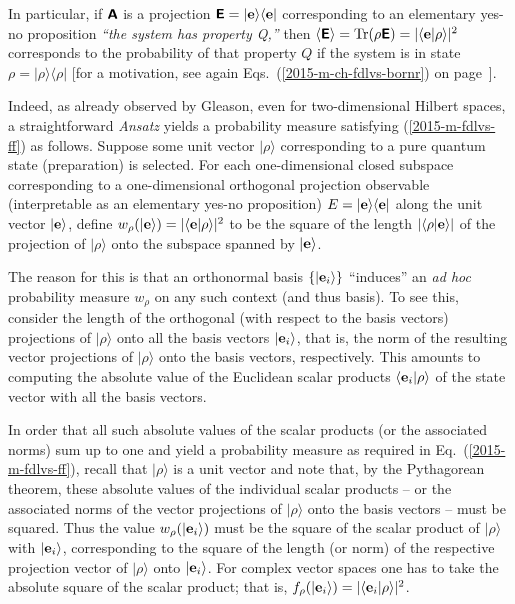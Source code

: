 In particular, if $\textsf{\textbf{A}}$ is a projection $\textsf{\textbf{E}}= \vert {\bf e} \rangle \langle {\bf e} \vert$
corresponding to an elementary yes-no proposition
{\it ``the system has property Q,''} then $\langle \textsf{\textbf{E}}\rangle = \textrm{Tr}({  \rho}  \textsf{\textbf{E}})
=
\vert \langle {\bf e}\vert \rho \rangle \vert^2$ corresponds
to the probability of that property $Q$ if the system is in state $\rho= \vert \rho \rangle \langle \rho \vert$
[for a motivation, see again Eqs.~(\ref{2015-m-ch-fdlvs-bornr}) on page~\pageref{2015-m-ch-fdlvs-bornr}].


Indeed, as already observed by Gleason, even for two-dimensional Hilbert spaces, a straightforward {\it Ansatz}
yields a  probability measure satisfying (\ref{2015-m-fdlvs-ff}) as follows.
Suppose some unit vector $\vert \rho \rangle$ corresponding to a pure quantum state (preparation) is selected.
For each one-dimensional closed subspace corresponding
to a one-dimensional orthogonal projection observable (interpretable as an elementary yes-no proposition)
$E=\vert {\bf e}\rangle \langle {\bf e} \vert$
along the unit vector $\vert {\bf e}\rangle$,
define
$w_\rho(\vert {\bf e}\rangle ) =  \vert \langle {\bf e} \vert  \rho \rangle \vert^2$
to be the  square of the length $\vert \langle \rho \vert {\bf e} \rangle \vert$ of the
projection of $\vert \rho \rangle$ onto the subspace spanned by $\vert {\bf e}\rangle$.



The reason for this is that an orthonormal
basis $\{  \vert  {\bf e}_i \rangle   \}$ ``induces''
an {\it ad hoc}  probability measure $w_\rho $
on any such context (and thus basis).
To see this,
consider the length  of
the orthogonal (with respect to the basis vectors)
projections of $\vert  \rho \rangle$
onto all the basis vectors $\vert  {\bf e}_i \rangle$,
that is, the norm of the resulting vector projections of $\vert \rho \rangle$ onto the basis vectors,
respectively.
This amounts to computing the absolute value of the Euclidean scalar products
$\langle  {\bf e}_i \vert  \rho \rangle$
of the state vector with all the basis vectors.


In order that all such  absolute values of the scalar products (or the associated norms)
sum up to one and yield a probability measure as required in Eq.~(\ref{2015-m-fdlvs-ff}),
recall that $\vert  \rho \rangle$ is a unit vector
and note that, by the Pythagorean theorem,
these  absolute values of the individual scalar products
-- or the associated norms of the vector projections of $\vert \rho \rangle$ onto the basis vectors --
must be squared.
Thus the value $w_\rho(\vert {\bf e}_i\rangle )$
must be the square of the scalar product of $\vert  \rho \rangle$
with $\vert  {\bf e}_i \rangle$,
corresponding to the square of the length (or norm) of
the respective projection vector of $\vert  \rho \rangle$ onto  $\vert  {\bf e}_i \rangle$.
For complex vector spaces one has to take the absolute square of the scalar product;
that is, $f_\rho (  \vert  {\bf e}_i \rangle   ) = \vert \langle  {\bf e}_i \vert  \rho \rangle \vert ^2$.

